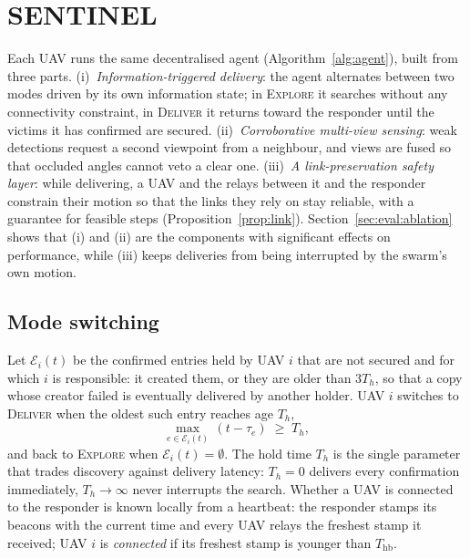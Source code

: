 \section{SENTINEL}\label{sec:method}

Each UAV runs the same decentralised agent (Algorithm~\ref{alg:agent}), built from three parts.
(i)~\emph{Information-triggered delivery}: the agent alternates between two modes driven by its own
information state; in \textsc{Explore} it searches without any connectivity constraint, in
\textsc{Deliver} it returns toward the responder until the victims it has confirmed are secured.
(ii)~\emph{Corroborative multi-view sensing}: weak detections request a second viewpoint from a
neighbour, and views are fused so that occluded angles cannot veto a clear one.
(iii)~\emph{A link-preservation safety layer}: while delivering, a UAV and the relays between it and
the responder constrain their motion so that the links they rely on stay reliable, with a
guarantee for feasible steps (Proposition~\ref{prop:link}). Section~\ref{sec:eval:ablation} shows that (i) and (ii) are the components with significant
effects on performance, while (iii) keeps deliveries from being interrupted by the swarm's own
motion.

\subsection{Mode switching}
Let $\mathcal{E}_i(t)$ be the confirmed entries held by UAV $i$ that are not secured and for which
$i$ is responsible: it created them, or they are older than $3T_h$, so that a copy whose creator
failed is eventually delivered by another holder. UAV $i$ switches to \textsc{Deliver} when the oldest such entry reaches age $T_h$,
\begin{equation}
\max_{e\in\mathcal{E}_i(t)}\,(t-\tau_e)\;\ge\;T_h,\label{eq:trigger}
\end{equation}
and back to \textsc{Explore} when $\mathcal{E}_i(t)=\emptyset$. The hold time $T_h$ is the single
parameter that trades discovery against delivery latency: $T_h=0$ delivers every confirmation
immediately, $T_h\to\infty$ never interrupts the search. Whether a UAV is connected to the
responder is known locally from a heartbeat: the responder stamps its beacons with the current
time and every UAV relays the freshest stamp it received; UAV $i$ is \emph{connected} if its
freshest stamp is younger than $T_{\mathrm{hb}}$.

